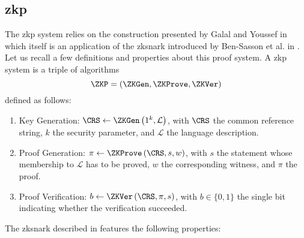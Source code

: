 \subsection{\acrlong{zkp}}
\label{sec:preliminary_zkp}
The \gls{zkp} system relies on the construction presented by Galal and Youssef in \cite{galal2018succinctly} which itself is an application of the \gls{zksnark} introduced by Ben-Sasson et al. in \cite{2014ben-sasson}. Let us recall a few definitions and properties
about this proof system. A \gls{zkp} system is a triple of
algorithms 
\begin{equation*}
    \ZKP = (\ZKGen, \ZKProve, \ZKVer)
\end{equation*}
defined as follows:
\begin{enumerate}
\item Key Generation: $\CRS \leftarrow \ZKGen \left(1^k, \mathcal{L}
  \right)$, with $\CRS$ the common reference string, $k$ the security
  parameter, and $\mathcal{L}$ the language description.
\item Proof Generation: $\pi \leftarrow \ZKProve \left(\CRS, s, w
  \right)$, with $s$ the statement whose membership to $\mathcal{L}$ has to be proved, $w$ the corresponding witness, and $\pi$ the proof.
\item Proof Verification: $b \leftarrow \ZKVer \left( \CRS, \pi, s
  \right)$, with $b \in \{0,1\}$ the single bit indicating whether the
  verification succeeded.
\end{enumerate}
The \gls{zksnark} described in \cite{2014ben-sasson} features the following properties:
